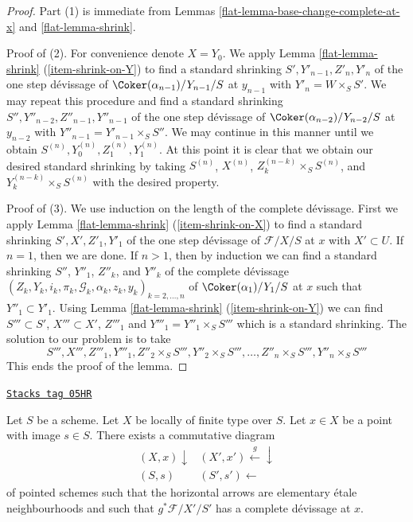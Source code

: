 \begin{proof}

Part (1) is immediate from
Lemmas \ref{flat-lemma-base-change-complete-at-x} and
\ref{flat-lemma-shrink}.

\medskip\noindent
Proof of (2). For convenience denote $X = Y_0$. We apply
Lemma \ref{flat-lemma-shrink} (\ref{item-shrink-on-Y})
to find a standard shrinking
$S', Y'_{n - 1}, Z'_n, Y'_n$
of the one step d\'evissage of $\Coker(\alpha_{n - 1})/Y_{n - 1}/S$
at $y_{n - 1}$ with $Y'_n = W \times_S S'$. We may repeat this procedure
and find a standard shrinking
$S'', Y''_{n - 2}, Z''_{n - 1}, Y''_{n - 1}$
of the one step d\'evissage of $\Coker(\alpha_{n - 2})/Y_{n - 2}/S$
at $y_{n - 2}$ with $Y''_{n - 1} = Y'_{n - 1} \times_S S''$.
We may continue in this manner until we obtain
$S^{(n)}, Y^{(n)}_0, Z^{(n)}_1, Y^{(n)}_1$.
At this point it is clear that we obtain our desired standard shrinking
by taking $S^{(n)}$, $X^{(n)}$, $Z_k^{(n - k)} \times_S S^{(n)}$, and
$Y_k^{(n - k)} \times_S S^{(n)}$ with the desired property.

\medskip\noindent
Proof of (3). We use induction on the length of the complete
d\'evissage. First we apply
Lemma \ref{flat-lemma-shrink} (\ref{item-shrink-on-X})
to find a standard shrinking
$S', X', Z'_1, Y'_1$
of the one step d\'evissage of $\mathcal{F}/X/S$ at $x$
with $X' \subset U$. If $n = 1$, then we are done.
If $n > 1$, then by induction we can find a standard shrinking
$S''$, $Y''_1$, $Z''_k$, and $Y''_k$ of the complete d\'evissage
$(Z_k, Y_k, i_k, \pi_k, \mathcal{G}_k, \alpha_k, z_k, y_k)_{k = 2, \ldots, n}$
of $\Coker(\alpha_1)/Y_1/S$ at $x$ such that
$Y''_1 \subset Y'_1$. Using
Lemma \ref{flat-lemma-shrink} (\ref{item-shrink-on-Y})
we can find $S''' \subset S'$, $X''' \subset X'$, $Z'''_1$ and
$Y'''_1 = Y''_1 \times_S S'''$ which is a standard shrinking.
The solution to our problem is to take
$$
S''', X''', Z'''_1, Y'''_1, Z''_2 \times_S S''',
Y''_2 \times_S S''', \ldots, Z''_n \times_S S''', Y''_n \times_S S'''
$$
This ends the proof of the lemma.
\end{proof}

\begin{proposition}
\label{flat-proposition-existence-complete-at-x}
\href{https://stacks.math.columbia.edu/tag/05HR}{\texttt{Stacks tag 05HR}}

Let $S$ be a scheme.
Let $X$ be locally of finite type over $S$.
Let $x \in X$ be a point with image $s \in S$.
There exists a commutative diagram
$$
\begin{array}{cc}(X, x) \downarrow & (X', x') \overset{g}{\longleftarrow}\downarrow \\ (S, s) & (S', s') \longleftarrow\end{array}
$$
of pointed schemes such that the horizontal
arrows are elementary \'etale neighbourhoods
and such that $g^*\mathcal{F}/X'/S'$ has a complete
d\'evissage at $x$.
\end{proposition}

